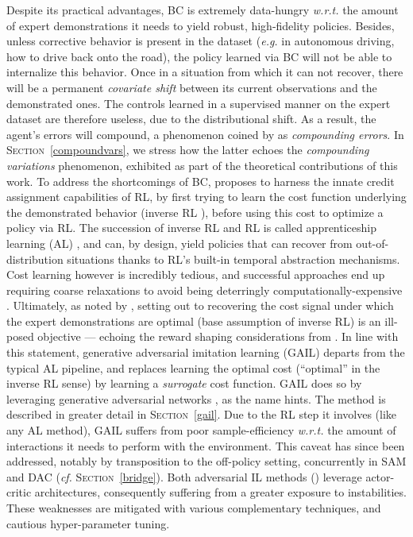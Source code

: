 Despite its practical advantages, BC is extremely data-hungry \textit{w.r.t.} the amount
of expert demonstrations it needs to yield robust, high-fidelity policies.
Besides, unless corrective behavior is present in the dataset
(\textit{e.g.} in autonomous driving, how to drive back onto the road),
the policy learned via BC will not be able to internalize this behavior.
Once in a situation from which it can not recover,
there will be a permanent \emph{covariate shift} between its current observations and
the demonstrated ones.
The controls learned in a supervised manner on the expert dataset are therefore useless,
due to the distributional shift.
As a result, the agent's errors will compound, a phenomenon coined by \cite{Ross2010-eb}
as \emph{compounding errors}.
In \textsc{Section}~\ref{compoundvars},
we stress how the latter echoes the \emph{compounding variations} phenomenon,
exhibited as part of the theoretical contributions of this work.
To address the shortcomings of BC, \cite{Abbeel2004-rb} proposes to harness
the innate credit assignment \cite{Sutton1998-ow} capabilities of RL,
by first trying to learn the cost function underlying the demonstrated behavior
(inverse RL \cite{Ng2000-qd}),
before using this cost to optimize a policy via RL.
The succession of inverse RL and RL is called apprenticeship learning (AL) \cite{Abbeel2004-rb},
and can, by design,
yield policies that can recover from out-of-distribution situations thanks to RL's
built-in temporal abstraction mechanisms.
Cost learning however is incredibly tedious, and successful approaches end up requiring
coarse relaxations to avoid being deterringly computationally-expensive
\cite{Abbeel2004-rb,Syed2008-su,Syed2008-zo,Ho2016-xn}.
Ultimately, as noted by \cite{Ziebart2008-fe},
setting out to recovering the cost signal under which
the expert demonstrations are optimal (base assumption of inverse RL) is an ill-posed objective
--- echoing the reward shaping considerations from \cite{Ng1999-lv}.
In line with this statement, generative adversarial imitation learning (GAIL) \cite{Ho2016-bv}
departs from the typical AL pipeline, and replaces learning
the optimal cost (``optimal'' in the inverse RL sense)
by learning a \emph{surrogate} cost function.
GAIL does so by leveraging generative adversarial networks \cite{Goodfellow2014-yk},
as the name hints.
The method is described in greater detail in \textsc{Section}~\ref{gail}.
Due to the RL step it involves (like any AL method),
GAIL suffers from poor sample-efficiency \textit{w.r.t.} the amount
of interactions it needs to perform with the environment.
This caveat has since been addressed, notably by transposition to the off-policy setting,
concurrently in SAM \cite{Blonde2019-vc} and DAC \cite{Kostrikov2019-jo}
(\textit{cf.} \textsc{Section}~\ref{bridge}).
Both adversarial IL methods (\cite{Blonde2019-vc,Kostrikov2019-jo})
leverage actor-critic architectures,
consequently suffering from a greater exposure to instabilities.
These weaknesses are mitigated with various complementary techniques,
and cautious hyper-parameter tuning.

